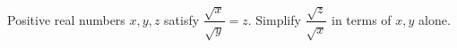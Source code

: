 Positive real numbers $x,y,z$ satisfy $\dfrac{\sqrt x}{\sqrt y}=z$. Simplify $\dfrac{\sqrt z}{\sqrt x}$ in terms of $x,y$ alone.
